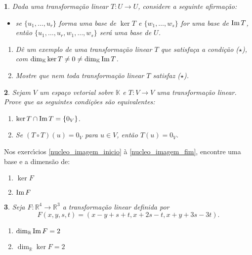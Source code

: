 \documentclass[12pt]{exam}
\newtheorem{exercicio}{}
\newcommand{\im}{{\rm Im\,}}
\newcommand{\real}{\mathbb{R}}
\newcommand{\cp}[1]{\mathbb{#1}}
\begin{document}
\begin{exercicio}
  Dada uma transforma\c{c}\~ao linear $T : U \to U$, considere a seguinte afirma\c{c}\~ao:
  \begin{itemize}
    \item[($\star$)] se $\{u_1,\dots,u_r\}$ forma uma base de $\ker T$ e $\{w_1,\dots,w_s\}$ for uma base de $\im T$, ent\~ao $\{u_1,\dots,u_r,w_1,\dots,w_s\}$ ser\'a uma base de $U$.
  \end{itemize}
  \begin{enumerate}[label=({\alph*})]
    \item D\^e um exemplo de uma transforma\c{c}\~ao linear $T$ que satisfa\c{c}a a condi\c{c}\~ao ($\star$), com $\dim_\cp{K}\ker T \ne 0 \ne \dim_\cp{K}\im T$.
    \item Mostre que nem toda transforma\c{c}\~ao linear $T$ satisfaz ($\star$).
  \end{enumerate}
\end{exercicio}

\begin{exercicio}
  Sejam $V$ um espa\c{c}o vetorial sobre $\cp{K}$ e $T : V \to V$ uma transforma\c{c}\~ao linear. Prove que as seguintes condi\c{c}\~oes s\~ao equivalentes:
  \begin{enumerate}[label=({\alph*})]
    \item $\ker T \cap \im T = \{0_V\}$.
    \item Se $(T\circ T)(u) = 0_V$ para $u \in V$, ent\~ao $T(u) = 0_V$.
  \end{enumerate}
\end{exercicio}

Nos exerc{\'\i}cios \eqref{nucleo_imagem_inicio} \`a \eqref{nucleo_imagem_fim}, encontre uma base e a dimens\~ao de:
\begin{enumerate}[label=({\alph*})]
    \item $\ker F$
    \item $\im F$
  \end{enumerate}

\begin{exercicio}\label{nucleo_imagem_inicio}
  Seja $F : \real^4 \to \real^3$ a transforma\c{c}\~ao linear definida por
  \[
    F(x,y,s,t) = (x - y + s + t, x + 2s - t, x + y + 3s - 3t).
  \]
  \begin{solucao}
    \begin{enumerate}[label=({\alph*})]
      \item $\dim_\real\im F = 2$
      \item $\dim_\real\ker F = 2$
    \end{enumerate}
  \end{solucao}
\end{exercicio}
\end{document}
